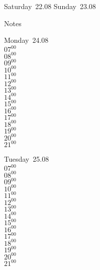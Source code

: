 \documentclass[11pt,a4paper]{book}\usepackage[]{graphicx}\usepackage[]{color}
\begin{document}
\begin{weekendbox}
  Saturday~22.08
  \tcblower
  Sunday~23.08
\end{weekendbox} %
\begin{notebox}
  Notes
\end{notebox}
\clearpage
\begin{headerbox}
\end{headerbox}
\begin{weekdaybox}
  Monday~24.08\\
  { 
  \vfill
  $07^{00}$\\
$08^{00}$\\
$09^{00}$\\
$10^{00}$\\
$11^{00}$\\
$12^{00}$\\
$13^{00}$\\
$14^{00}$\\
$15^{00}$\\
$16^{00}$\\
$17^{00}$\\
$18^{00}$\\
$19^{00}$\\
$20^{00}$\\
$21^{00}$\\
  }
\end{weekdaybox}
\begin{weekdaybox}
  Tuesday~25.08\\
  { 
  \vfill
  $07^{00}$\\
$08^{00}$\\
$09^{00}$\\
$10^{00}$\\
$11^{00}$\\
$12^{00}$\\
$13^{00}$\\
$14^{00}$\\
$15^{00}$\\
$16^{00}$\\
$17^{00}$\\
$18^{00}$\\
$19^{00}$\\
$20^{00}$\\
$21^{00}$\\
  }
\end{weekdaybox}
\end{document}
